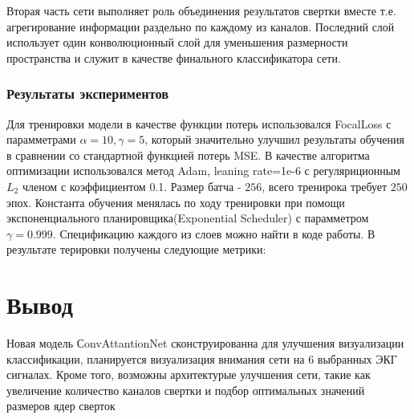 \documentclass[oneside,final,14pt]{extreport}
\begin{document}
Вторая часть сети выполняет роль объединения результатов свертки вместе т.е. агрегирование информации раздельно по каждому из каналов. Последний слой использует один конволюционный слой для уменьшения размерности пространства и служит в качестве финального классификатора сети.


\subsection{Результаты экспериментов}
Для тренировки модели в качестве функции потерь использовался FocalLoss с парамметрами $\alpha=10, \gamma=5$, который значительно улучшил результаты обучения в сравнении со стандартной функцией потерь MSE.  В качестве алгоритма оптимизации использовался метод Adam, leaning rate=1e-6 с регуляриционным $L_2$ членом с коэффициентом 0.1. Размер батча - $256$, всего тренирока требует $250$ эпох.  Константа обучения менялась по ходу тренировки при помощи экспоненциального планировщика(Exponential Scheduler) с парамметром $\gamma=0.999$.  Спецификацию каждого из слоев можно найти в коде работы.   В результате терировки получены следующие метрики:

\chapter{Вывод}
Новая модель СonvAttantionNet сконструированна для улучшения визуализации классификации, планируется визуализация внимания сети на 6 выбранных ЭКГ сигналах. Кроме того, возможны архитектурые улучшения сети, такие как увеличение количество каналов свертки и подбор оптимальных значений размеров ядер сверток
\end{document}
